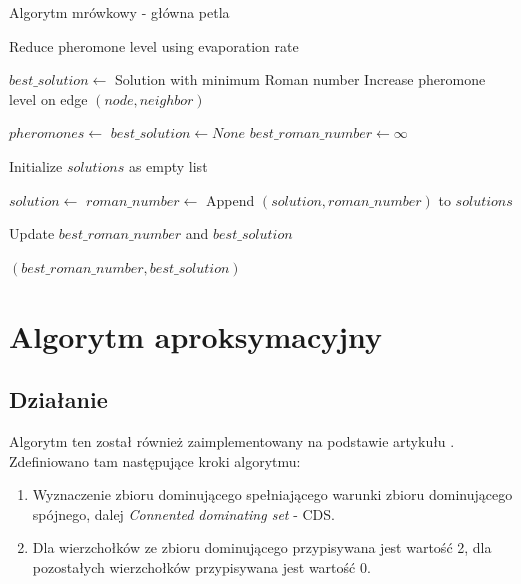 \begin{algorithm}
    \caption*{Algorytm mrówkowy - główna petla}
    \begin{algorithmic}[1]
    
            \State Reduce pheromone level using evaporation rate
        \EndFor

        \State $best\_solution \gets$ Solution with minimum Roman number
                \State Increase pheromone level on edge $(node, neighbor)$
            \EndFor
        \EndFor
    \EndFunction

        \State $pheromones \gets$ 
        \State $best\_solution \gets None$
        \State $best\_roman\_number \gets \infty$

            \State Initialize $solutions$ as empty list

                \State $solution \gets$ 
                \State $roman\_number \gets$ 
                \State Append $(solution, roman\_number)$ to $solutions$

                    \State Update $best\_roman\_number$ and $best\_solution$
                \EndIf
            \EndFor

            \State {}
        \EndFor

        \State \Return $(best\_roman\_number, best\_solution)$
    \EndFunction
    
    \end{algorithmic}
\end{algorithm}

\FloatBarrier
\section{Algorytm aproksymacyjny}
\subsection{Działanie}

Algorytm ten został również zaimplementowany na podstawie artykułu \cite{ILP}. Zdefiniowano tam następujące kroki algorytmu:
\begin{enumerate}
    \item Wyznaczenie zbioru dominującego spełniającego warunki zbioru dominującego spójnego, dalej \textit{Connented dominating set} - CDS.
    \item Dla wierzchołków ze zbioru dominującego przypisywana jest wartość 2, dla pozostałych wierzchołków przypisywana jest wartość 0.
\end{enumerate}

